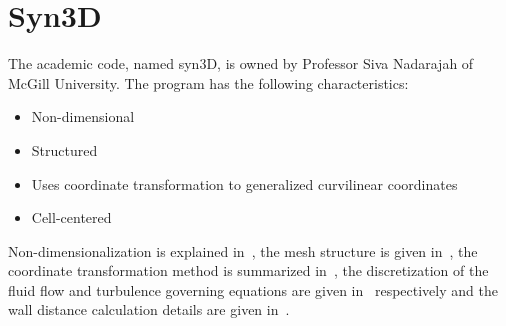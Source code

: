 \section{Syn3D}
\label{sec:syn3d}
%
%
The academic code, named syn3D, is owned by Professor Siva Nadarajah of McGill University. The program has the following characteristics:
\begin{itemize}
    \item Non-dimensional
    \item Structured
    \item Uses coordinate transformation to generalized curvilinear coordinates
    \item Cell-centered
\end{itemize}
Non-dimensionalization is explained in~, the mesh structure is given in~, the coordinate transformation method is summarized in~, the discretization of the fluid flow and turbulence governing equations are given in~ respectively and the wall distance calculation details are given in~.
%
